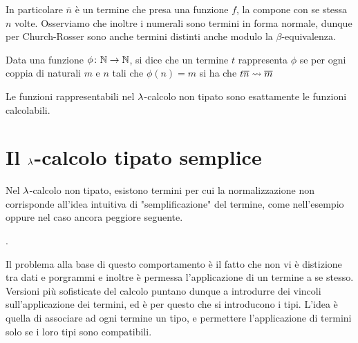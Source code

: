 \documentclass[]{marticle}
\begin{document}
In particolare $\overline{n}$ \`e un termine che presa una funzione $f$, la
compone con se stessa $n$ volte. Osserviamo che inoltre i numerali sono termini
in forma normale, dunque per Church-Rosser sono anche termini distinti anche
modulo la $\beta$-equivalenza.

\begin{block}[Definizione]
    Data una funzione $\phi\colon \mathbb{N} \rightarrow \mathbb{N}$, si dice che un termine
    $t$ rappresenta $\phi$ se per ogni coppia di naturali $m$ e $n$ tali che
    $\phi(n)=m$ si ha che $t\overline{n}\rightsquigarrow\overline{m}$
\end{block}

\begin{block}[Teorema]
    Le funzioni rappresentabili nel $\lambda$-calcolo non tipato sono esattamente le
    funzioni calcolabili.
\end{block}

\section{Il $\lambda$-calcolo tipato semplice}

Nel $\lambda$-calcolo non tipato, esistono termini per cui la normalizzazione non
corrisponde all'idea intuitiva di "semplificazione" del termine, come
nell'esempio  oppure nel caso ancora peggiore seguente.

\begin{block}[Esempio]
    .
\end{block} 

Il problema alla base di questo comportamento \`e il fatto che non vi \`e
distizione tra dati e porgrammi e inoltre \`e permessa l'applicazione di un
termine a se stesso. Versioni pi\`u sofisticate del calcolo puntano dunque a
introdurre dei vincoli sull'applicazione dei termini, ed \`e per questo che si
introducono i tipi. L'idea \`e quella di associare ad ogni termine un tipo, e
permettere l'applicazione di termini solo se i loro tipi sono compatibili.

\begin{block}[Definizione]


\end{block}
\end{document}
